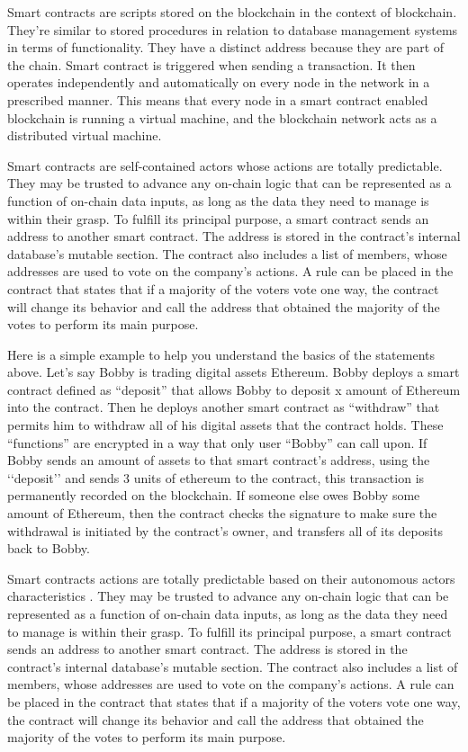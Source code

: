 \documentclass[10pt,twocolumn]{article}
\begin{document}
Smart contracts are scripts stored on the blockchain in the context of blockchain. They're similar to stored procedures in relation to database management systems in terms of functionality. They have a distinct address because they are part of the chain. Smart contract is triggered when sending a transaction. It then operates independently and automatically on every node in the network in a prescribed manner. This means that every node in a smart contract enabled blockchain is running a virtual machine, and the blockchain network acts as a distributed virtual machine.

Smart contracts are self-contained actors whose actions are totally predictable. They may be trusted to advance any on-chain logic that can be represented as a function of on-chain data inputs, as long as the data they need to manage is within their grasp. To fulfill its principal purpose, a smart contract sends an address to another smart contract. The address is stored in the contract's internal database's mutable section. The contract also includes a list of members, whose addresses are used to vote on the company's actions. A rule can be placed in the contract that states that if a majority of the voters vote one way, the contract will change its behavior and call the address that obtained the majority of the votes to perform its main purpose.

Here is a simple example to help you understand the basics of the statements above. Let’s say Bobby is trading digital assets Ethereum. Bobby deploys a smart contract defined as “deposit” that allows Bobby to deposit x amount of Ethereum into the contract. Then he deploys another smart contract as “withdraw” that permits him to withdraw all of his digital assets that the contract holds. These “functions” are encrypted  in a way that only user “Bobby” can call upon. If Bobby sends an amount of assets to that smart contract’s address, using the  ‘‘deposit’’ and sends 3 units of ethereum to the contract, this transaction is permanently recorded on the blockchain. If someone else owes Bobby some amount of Ethereum, then the contract checks the signature to make sure the withdrawal is initiated by the contract’s owner, and transfers all of its deposits back to Bobby.

Smart contracts actions are totally predictable based on their autonomous actors characteristics . They may be trusted to advance any on-chain logic that can be represented as a function of on-chain data inputs, as long as the data they need to manage is within their grasp. To fulfill its principal purpose, a smart contract sends an address to another smart contract. The address is stored in the contract's internal database's mutable section. The contract also includes a list of members, whose addresses are used to vote on the company's actions. A rule can be placed in the contract that states that if a majority of the voters vote one way, the contract will change its behavior and call the address that obtained the majority of the votes to perform its main purpose.
\end{document}
